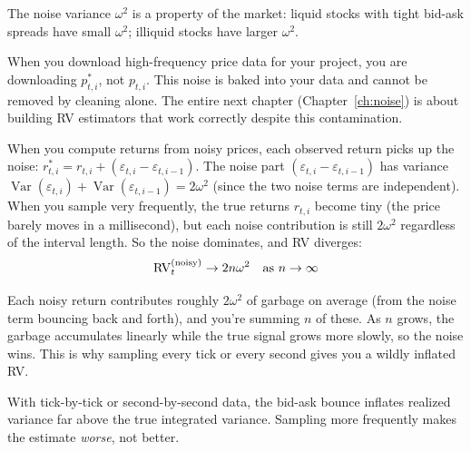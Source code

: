 \begin{intuition}
The noise variance $\omega^2$ is a property of the market: liquid stocks with tight bid-ask spreads have small $\omega^2$; illiquid stocks have larger $\omega^2$.
\end{intuition}

\begin{projectconnection}
When you download high-frequency price data for your project, you are downloading $p^*_{t,i}$, not $p_{t,i}$.
This noise is baked into your data and cannot be removed by cleaning alone.
The entire next chapter (Chapter~\ref{ch:noise}) is about building RV estimators that work correctly despite this contamination.
\end{projectconnection}

When you compute returns from noisy prices, each observed return picks up the noise:
$r^*_{t,i} = r_{t,i} + (\varepsilon_{t,i} - \varepsilon_{t,i-1})$.
The noise part $(\varepsilon_{t,i} - \varepsilon_{t,i-1})$ has variance $\operatorname{Var}(\varepsilon_{t,i}) + \operatorname{Var}(\varepsilon_{t,i-1}) = 2\omega^2$ (since the two noise terms are independent).
When you sample very frequently, the true returns $r_{t,i}$ become tiny (the price barely moves in a millisecond), but each noise contribution is still $2\omega^2$ regardless of the interval length.
So the noise dominates, and RV diverges:
\begin{equation}
  \operatorname{RV}_t^{(\text{noisy})} \to 2n\omega^2 \quad \text{as } n \to \infty
  \label{eq:rv-noise-divergence}
\end{equation}

\begin{intuition}
Each noisy return contributes roughly $2\omega^2$ of garbage on average (from the noise term bouncing back and forth), and you're summing $n$ of these.
As $n$ grows, the garbage accumulates linearly while the true signal grows more slowly, so the noise wins.
This is why sampling every tick or every second gives you a wildly inflated RV.
\end{intuition}

\begin{warning}
With tick-by-tick or second-by-second data, the bid-ask bounce inflates realized variance far above the true integrated variance.
Sampling more frequently makes the estimate \emph{worse}, not better.
\end{warning}

